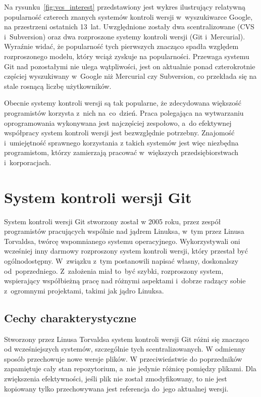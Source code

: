 \documentclass[12pt,a4paper,polish,thesis]{dcsbook}
\begin{document}
	Na rysunku~\ref{fig:vcs_interest} przedstawiony jest wykres ilustrujący relatywną popularność czterech znanych systemów kontroli wersji w~wyszukiwarce Google, na przestrzeni ostatnich 13~lat. Uwzględnione zostały dwa scentralizowane (CVS i~Subversion) oraz dwa rozproszone systemy kontroli wersji (Git i~Mercurial). Wyraźnie widać, że popularność tych pierwszych znacząco spadła względem rozproszonego modelu, który wciąż zyskuje na popularności. Przewaga systemu Git nad pozostałymi nie ulega wątpliwości, jest on aktualnie ponad czterokrotnie częściej wyszukiwany w~Google niż Mercurial czy Subversion, co przekłada się na stale rosnącą liczbę użytkowników.

	Obecnie systemy kontroli wersji są tak popularne, że zdecydowana większość programistów korzysta z~nich na~co~dzień. Praca polegająca na wytwarzaniu oprogramowania wykonywana jest najczęściej zespołowo, a~do efektywnej współpracy system kontroli wersji jest bezwzględnie potrzebny. Znajomość i~umiejętność sprawnego korzystania z takich systemów jest więc niezbędna programistom, którzy zamierzają pracować w~większych przedsiębiorstwach i~korporacjach.

	\section{System kontroli wersji Git}

	System kontroli wersji Git stworzony został w 2005 roku, przez zespół programistów pracujących wspólnie nad jądrem Linuksa, w~tym przez Linusa Torvaldsa, twórcę wspomnianego systemu operacyjnego. Wykorzystywali oni wcześniej inny darmowy rozproszony system kontroli wersji, który przestał być ogólnodostępny. W~związku z~tym postanowili napisać własny, doskonalszy od~poprzedniego. Z~założenia miał to~być szybki, rozproszony system, wspierający współbieżną pracę nad różnymi aspektami i~dobrze radzący sobie z~ogromnymi projektami, takimi jak jądro Linuksa.

	\subsection{Cechy charakterystyczne}
	Stworzony przez Linusa Torvaldsa system kontroli wersji Git różni się znacząco od wcześniejszych systemów, szczególnie tych scentralizowanych. W odmienny sposób przechowuje nowe wersje plików. W przeciwieństwie do poprzedników zapamiętuje cały stan repozytorium, a~nie jedynie różnicę pomiędzy plikami. Dla zwiększenia efektywności, jeśli plik nie został zmodyfikowany, to nie jest kopiowany tylko przechowywana jest referencja do~jego aktualnej wersji.
\end{document}
